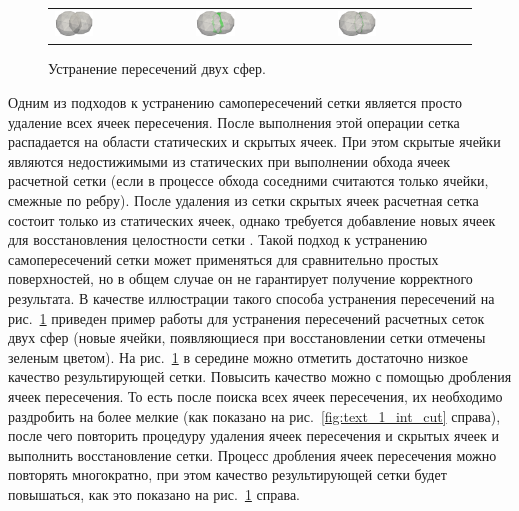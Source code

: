 \begin{figure}[h]
\centering
\begin{tabular}{lll}
\includegraphics[width=0.3\textwidth]{./pics/text_1_int/pic_zip_01.png}
&
\includegraphics[width=0.3\textwidth]{./pics/text_1_int/pic_zip_09.png}
&
\includegraphics[width=0.3\textwidth]{./pics/text_1_int/pic_zip_15.png}
\end{tabular}
\caption{Устранение пересечений двух сфер.}
\label{fig:text_1_int_spheres}
\end{figure}

Одним из подходов к устранению самопересечений сетки является просто удаление всех ячеек пересечения.
После выполнения этой операции сетка распадается на области статических и скрытых ячеек.
При этом скрытые ячейки являются недостижимыми из статических при выполнении обхода ячеек расчетной сетки (если в процессе обхода соседними считаются только ячейки, смежные по ребру).
После удаления из сетки скрытых ячеек расчетная сетка состоит только из статических ячеек, однако требуется добавление новых ячеек для восстановления целостности сетки \cite{Charton2021Repair}.
Такой подход к устранению самопересечений сетки может применяться для сравнительно простых поверхностей, но в общем случае он не гарантирует получение корректного результата.
В качестве иллюстрации такого способа устранения пересечений на рис.~\ref{fig:text_1_int_spheres} приведен пример работы для устранения пересечений расчетных сеток двух сфер (новые ячейки, появляющиеся при восстановлении сетки отмечены зеленым цветом).
На рис.~\ref{fig:text_1_int_spheres} в середине можно отметить достаточно низкое качество результирующей сетки.
Повысить качество можно с помощью дробления ячеек пересечения.
То есть после поиска всех ячеек пересечения, их необходимо раздробить на более мелкие (как показано на рис.~\ref{fig:text_1_int_cut} справа), после чего повторить процедуру удаления ячеек пересечения и скрытых ячеек и выполнить восстановление сетки.
Процесс дробления ячеек пересечения можно повторять многократно, при этом качество результирующей сетки будет повышаться, как это показано на рис.~\ref{fig:text_1_int_spheres} справа.

